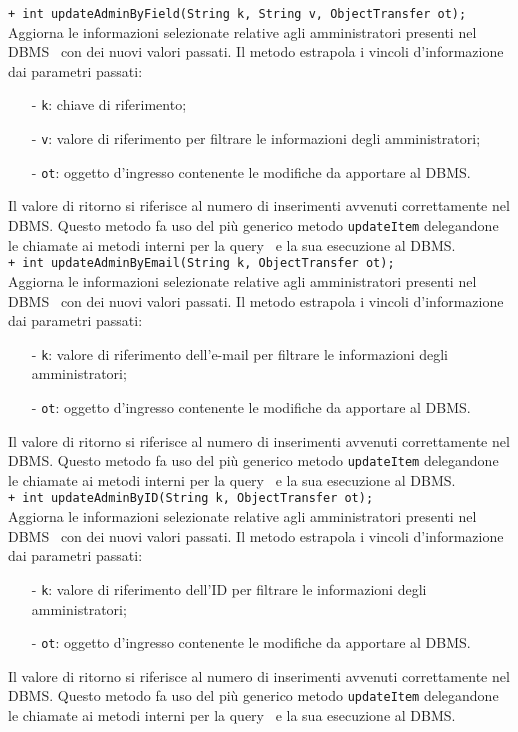 {\begin{sloppypar}
{{{{\begin{itemize}
{				\texttt{+ int updateAdminByField(String k, String v, ObjectTransfer ot);}\\
				Aggiorna le informazioni selezionate relative agli amministratori presenti nel DBMS\g~ con dei nuovi valori passati.
				Il metodo estrapola i vincoli d'informazione dai parametri passati:
				\begin{itemize}
					\item[-] \texttt{k}: chiave di riferimento;
					\item[-] \texttt{v}: valore di riferimento per filtrare le informazioni degli amministratori;
					\item[-] \texttt{ot}: oggetto d'ingresso contenente le modifiche da apportare al DBMS\g.
				\end{itemize}
				Il valore  di ritorno si riferisce al numero di inserimenti avvenuti correttamente nel DBMS\g.
				Questo metodo fa uso del più generico metodo \texttt{updateItem} delegandone le chiamate ai metodi interni per la query\g~ e la sua esecuzione al DBMS\g.\\
				
				\texttt{+ int updateAdminByEmail(String k, ObjectTransfer ot);}\\
				Aggiorna le informazioni selezionate relative agli amministratori presenti nel DBMS\g~ con dei nuovi valori passati.
				Il metodo estrapola i vincoli d'informazione dai parametri passati:
				\begin{itemize}
					\item[-] \texttt{k}: valore di riferimento dell'e-mail per filtrare le informazioni degli amministratori;
					\item[-] \texttt{ot}: oggetto d'ingresso contenente le modifiche da apportare al DBMS\g.
				\end{itemize}
				Il valore  di ritorno si riferisce al numero di inserimenti avvenuti correttamente nel DBMS\g.
				Questo metodo fa uso del più generico metodo \texttt{updateItem} delegandone le chiamate ai metodi interni per la query\g~ e la sua esecuzione al DBMS\g.\\
				
				\texttt{+ int updateAdminByID(String k, ObjectTransfer ot);}\\
				Aggiorna le informazioni selezionate relative agli amministratori presenti nel DBMS\g~ con dei nuovi valori passati.
				Il metodo estrapola i vincoli d'informazione dai parametri passati:
				\begin{itemize}
					\item[-] \texttt{k}: valore di riferimento dell'ID per filtrare le informazioni degli amministratori;
					\item[-] \texttt{ot}: oggetto d'ingresso contenente le modifiche da apportare al DBMS\g.
				\end{itemize}
				Il valore  di ritorno si riferisce al numero di inserimenti avvenuti correttamente nel DBMS\g.
				Questo metodo fa uso del più generico metodo \texttt{updateItem} delegandone le chiamate ai metodi interni per la query\g~ e la sua esecuzione al DBMS\g.\\
				
}
\end{itemize}}}}}
\end{sloppypar}}
